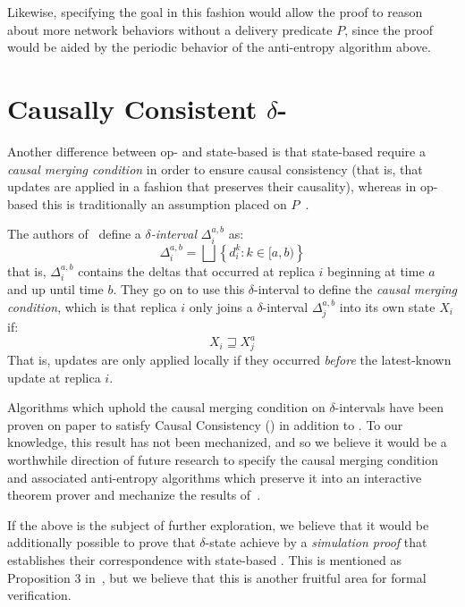 Likewise, specifying the goal in this fashion would allow the proof to reason
about more network behaviors without a delivery predicate $P$, since the proof
would be aided by the periodic behavior of the anti-entropy algorithm above.

\section{Causally Consistent $\delta$-\CRDTs}

Another difference between op- and state-based \CRDTs is that state-based \CRDTs
require a \emph{causal merging condition} in order to ensure causal consistency
(that is, that updates are applied in a fashion that preserves their causality),
whereas in op-based \CRDTs this is traditionally an assumption placed on
$P$~\citep{shapiro11}.

The authors of~\citep{almedia18} define a \emph{$\delta$-interval}
$\Delta^{a,b}_i$ as:
\[
  \Delta^{a,b}_i = \bigsqcup \left\{ d_i^k : k \in [a, b) \right\}
\]
that is, $\Delta^{a,b}_i$ contains the deltas that occurred at replica $i$
beginning at time $a$ and up until time $b$. They go on to use this
$\delta$-interval to define the \emph{causal merging condition}, which is that
replica $i$ only joins a $\delta$-interval $\Delta^{a,b}_j$ into its own state
$X_i$ if:
\[
  X_i \sqsupseteq X_j^a
\]
That is, updates are only applied locally if they occurred \emph{before} the
latest-known update at replica $i$.

Algorithms which uphold the causal merging condition on $\delta$-intervals have
been proven on paper to satisfy Causal Consistency (\CC) in addition to \SEC. To
our knowledge, this result has not been mechanized, and so we believe it would
be a worthwhile direction of future research to specify the causal merging
condition and associated anti-entropy algorithms which preserve it into an
interactive theorem prover and mechanize the results of~\citep{almedia18}.

If the above is the subject of further exploration, we believe that it would be
additionally possible to prove that $\delta$-state \CRDTs achieve \SEC by a
\emph{simulation proof} that establishes their correspondence with state-based
\CRDTs. This is mentioned as Proposition 3 in~\citep{almedia18}, but we believe
that this is another fruitful area for formal verification.

